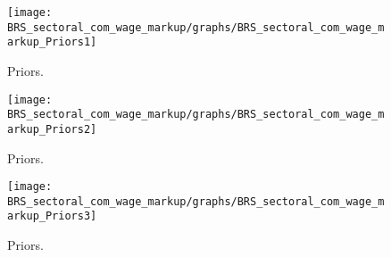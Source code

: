  
\begin{figure}[H]
\centering
\texttt{[image: BRS\_sectoral\_com\_wage\_markup/graphs/BRS\_sectoral\_com\_wage\_markup\_Priors1]}
\caption{Priors.}\label{Fig:Priors:1}
\end{figure}
\begin{figure}[H]
\centering
\texttt{[image: BRS\_sectoral\_com\_wage\_markup/graphs/BRS\_sectoral\_com\_wage\_markup\_Priors2]}
\caption{Priors.}\label{Fig:Priors:2}
\end{figure}
\begin{figure}[H]
\centering
\texttt{[image: BRS\_sectoral\_com\_wage\_markup/graphs/BRS\_sectoral\_com\_wage\_markup\_Priors3]}
\caption{Priors.}\label{Fig:Priors:3}
\end{figure}
 
